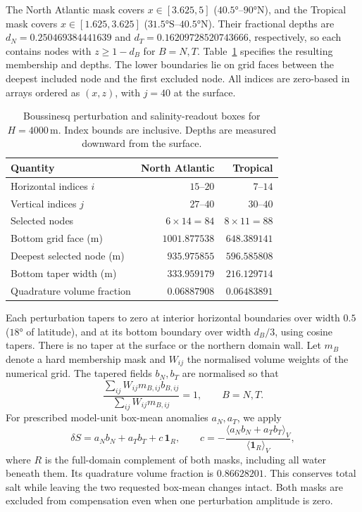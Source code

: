 \documentclass[12pt, a4paper]{article}
\begin{document}
The North Atlantic mask covers $x\in[3.625,5]$ ($40.5°$--$90°\text{N}$), and the Tropical mask covers $x\in[1.625,3.625]$ ($31.5°\text{S}$--$40.5°\text{N}$). Their fractional depths are $d_N=0.250469384441639$ and $d_T=0.16209728520743666$, respectively, so each contains nodes with $z\geq1-d_B$ for $B=N,T$. Table~\ref{tab:boussinesq-boxes} specifies the resulting membership and depths. The lower boundaries lie on grid faces between the deepest included node and the first excluded node. All indices are zero-based in arrays ordered as $(x,z)$, with $j=40$ at the surface.

\begin{table}[t]
  \centering
  \caption{Boussinesq perturbation and salinity-readout boxes for $H=4000\,\mathrm{m}$. Index bounds are inclusive. Depths are measured downward from the surface.}
  \label{tab:boussinesq-boxes}
  \begin{tabular}{lrr}
    \toprule
    Quantity & North Atlantic & Tropical \\
    \midrule
    Horizontal indices $i$ & $15$--$20$ & $7$--$14$ \\
    Vertical indices $j$ & $27$--$40$ & $30$--$40$ \\
    Selected nodes & $6\times14=84$ & $8\times11=88$ \\
    Bottom grid face (m) & $1001.877538$ & $648.389141$ \\
    Deepest selected node (m) & $935.975855$ & $596.585808$ \\
    Bottom taper width (m) & $333.959179$ & $216.129714$ \\
    Quadrature volume fraction & $0.06887908$ & $0.06483891$ \\
    \bottomrule
  \end{tabular}
\end{table}

Each perturbation tapers to zero at interior horizontal boundaries over width $0.5$ ($18°$ of latitude), and at its bottom boundary over width $d_B/3$, using cosine tapers. There is no taper at the surface or the northern domain wall. Let $m_B$ denote a hard membership mask and $W_{ij}$ the normalised volume weights of the numerical grid. The tapered fields $b_N,b_T$ are normalised so that
\begin{equation}
  \frac{\sum_{ij}W_{ij}m_{B,ij}b_{B,ij}}{\sum_{ij}W_{ij}m_{B,ij}}=1,
  \qquad B=N,T.
\end{equation}
For prescribed model-unit box-mean anomalies $a_N,a_T$, we apply
\begin{equation}
  \delta S=a_Nb_N+a_Tb_T+c\,\mathbf{1}_R,
  \qquad c=-\frac{\langle a_Nb_N+a_Tb_T\rangle_V}{\langle\mathbf{1}_R\rangle_V},
\end{equation}
where $R$ is the full-domain complement of both masks, including all water beneath them. Its quadrature volume fraction is $0.86628201$. This conserves total salt while leaving the two requested box-mean changes intact. Both masks are excluded from compensation even when one perturbation amplitude is zero.
\end{document}
